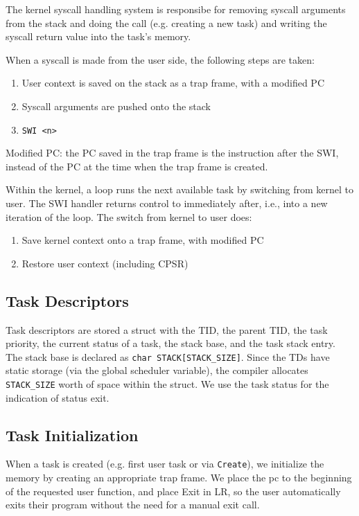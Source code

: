\documentclass{article}
\begin{document}
The kernel syscall handling system is responsibe for removing syscall arguments from the stack and doing the call (e.g. creating a new task) and writing the syscall return value into the task's memory.

When a syscall is made from the user side, the following steps are taken:

\begin{enumerate}
\item User context is saved on the stack as a trap frame, with a modified PC
\item Syscall arguments are pushed onto the stack
\item \texttt{SWI <n>}
\end{enumerate}

Modified PC: the PC saved in the trap frame is the instruction after the SWI, instead of the PC at the time when the trap frame is created.

Within the kernel, a loop runs the next available task by switching from kernel to user. The SWI handler returns control to immediately after, i.e., into a new iteration of the loop. The switch from kernel to user does:

\begin{enumerate}
\item Save kernel context onto a trap frame, with modified PC
\item Restore user context (including CPSR)
\end{enumerate}

\subsection*{Task Descriptors}

Task descriptors are stored a struct with the TID, the parent TID, the task priority, the current status of a task, the stack base, and the task stack entry. The stack base is declared as \texttt{char STACK[STACK\_SIZE]}. Since the TDs have static storage (via the global scheduler variable), the compiler allocates \texttt{STACK\_SIZE} worth of space within the struct. We use the task status for the indication of status exit.

\subsection*{Task Initialization}

When a task is created (e.g. first user task or via \texttt{Create}), we initialize the memory by creating an appropriate trap frame. We place the pc to the beginning of the requested user function, and place Exit in LR, so the user automatically exits their program without the need for a manual exit call.
\end{document}
